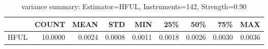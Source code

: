 \begin{table}[ht]
\centering
\caption{variance summary: Estimator=HFUL, Instruments=142, Strength=0.90}
\begin{tabular}{lrrrrrrrr}
\toprule
 & COUNT & MEAN & STD & MIN & 25\% & 50\% & 75\% & MAX \\
\midrule
HFUL & 10.0000 & 0.0024 & 0.0008 & 0.0011 & 0.0018 & 0.0026 & 0.0030 & 0.0036 \\
\bottomrule
\end{tabular}
\end{table}

